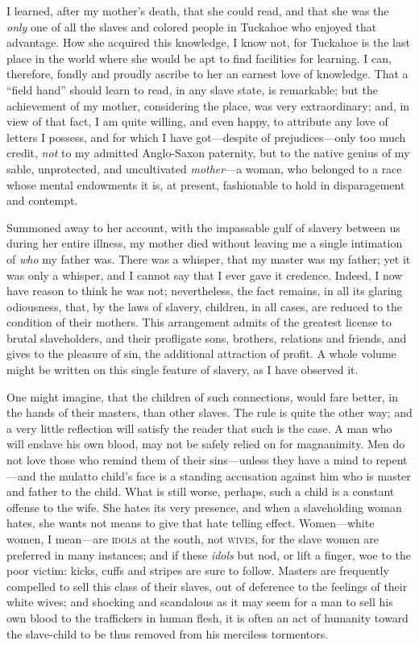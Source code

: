 I learned, after my mother's death, that she could {}read, and that she
was the \emph{only} one of all the slaves and colored people in Tuckahoe
who enjoyed that advantage. How she acquired this knowledge, I know not,
for Tuckahoe is the last place in the world where she would be apt to
find facilities for learning. I can, therefore, fondly and proudly
ascribe to her an earnest love of knowledge. That a ``field hand''
should learn to read, in any slave state, is remarkable; but the
achievement of my mother, considering the place, was very extraordinary;
and, in view of that fact, I am quite willing, and even happy, to
attribute any love of letters I possess, and for which I have
got---despite of prejudices---only too much credit, \emph{not} to my
admitted Anglo-Saxon paternity, but to the native genius of my sable,
unprotected, and uncultivated \emph{mother}---a woman, who belonged to a
race whose mental endowments it is, at present, fashionable to hold in
disparagement and contempt.

Summoned away to her account, with the impassable gulf of slavery
between us during her entire illness, my mother died without leaving me
a single intimation of \emph{who} my father was. There was a whisper,
that my master was my father; yet it was only a whisper, and I cannot
say that I ever gave it credence. Indeed, I now have reason to think he
was not; nevertheless, the fact remains, in all its glaring odiousness,
that, by the laws of slavery, children, in all cases, are reduced to the
condition of their mothers. This arrangement admits of the greatest
license to brutal slaveholders, and their profligate sons, brothers,
relations and friends, and gives to the pleasure of sin, the additional
attraction of profit. A whole volume might {}be written on this single
feature of slavery, as I have observed it.

One might imagine, that the children of such connections, would fare
better, in the hands of their masters, than other slaves. The rule is
quite the other way; and a very little reflection will satisfy the
reader that such is the case. A man who will enslave his own blood, may
not be safely relied on for magnanimity. Men do not love those who
remind them of their sins---unless they have a mind to repent---and the
mulatto child's face is a standing accusation against him who is master
and father to the child. What is still worse, perhaps, such a child is a
constant offense to the wife. She hates its very presence, and when a
slaveholding woman hates, she wants not means to give that hate telling
effect. Women---white women, I mean---are \textsc{idols} at the south,
not \textsc{wives}, for the slave women are preferred in many instances;
and if these \emph{idols} but nod, or lift a finger, woe to the poor
victim: kicks, cuffs and stripes are sure to follow. Masters are
frequently compelled to sell this class of their slaves, out of
deference to the feelings of their white wives; and shocking and
scandalous as it may seem for a man to sell his own blood to the
traffickers in human flesh, it is often an act of humanity toward the
slave-child to be thus removed from his merciless tormentors.

